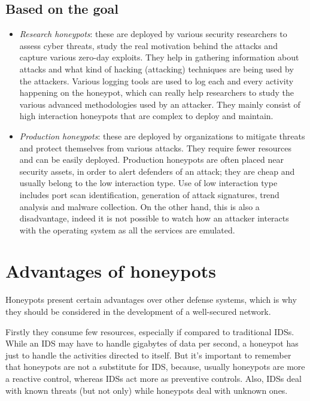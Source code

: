 \documentclass[epsfig,a4paper,11pt,titlepage,oneside,openany]{book}
\begin{document}
\section{Based on the goal}

\begin{itemize}
\item \textit{Research honeypots}: these are deployed by various security researchers to assess cyber threats, study the real motivation behind the attacks and capture various zero-day exploits. They help in gathering information about attacks and what kind of hacking (attacking) techniques are being used by the attackers. Various logging tools are used to log each and every activity happening on the honeypot, which can really help researchers to study the various advanced methodologies used by an attacker. They mainly consist of high interaction honeypots that are complex to deploy and maintain.


\item \textit{Production honeypots}: these are deployed by organizations to mitigate threats and protect themselves from various attacks. They require fewer resources and can be easily deployed. Production honeypots are often placed near security assets, in order to alert defenders of an attack; they are cheap and usually belong to the low interaction type. Use of low interaction type includes port scan identification, generation of attack signatures, trend analysis and malware collection. On the other hand, this is also a disadvantage, indeed it is not possible to watch how an attacker interacts with the operating system as all the services are emulated.


\end{itemize}

\chapter{Advantages of honeypots}
Honeypots present certain advantages over other defense systems, which is why they should be considered in the development of a well-secured network.

Firstly they consume few resources, especially if compared to traditional IDSs. While an IDS may have to handle gigabytes of data per second, a honeypot has just to handle the activities directed to itself. But it’s important to remember that honeypots are not a substitute for IDS, because, usually honeypots are more a reactive control, whereas IDSs act more as preventive controls. Also, IDSs deal with known threats (but not only) while honeypots deal with unknown ones.
\end{document}
